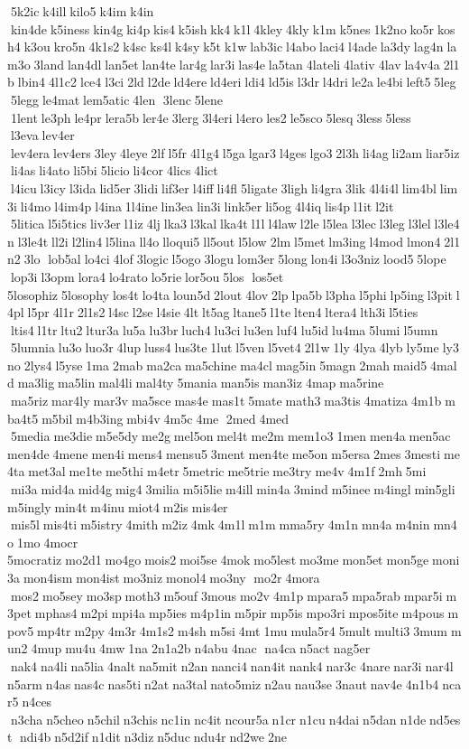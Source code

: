  5k2ic k4ill kilo5 k4im k4in  kin4de k5iness kin4g ki4p kis4 k5ish kk4 k1l 4kley 4kly k1m k5nes 1k2no ko5r kosh4 k3ou kro5n 4k1s2 k4sc ks4l k4sy k5t k1w lab3ic l4abo laci4 l4ade la3dy lag4n lam3o 3land lan4dl lan5et lan4te lar4g lar3i las4e la5tan 4lateli 4lativ 4lav la4v4a 2l1b lbin4 4l1c2 lce4 l3ci 2ld l2de ld4ere ld4eri ldi4 ld5is l3dr l4dri le2a le4bi left5 5leg  5legg le4mat lem5atic 4len  3lenc 5lene  1lent le3ph le4pr lera5b ler4e 3lerg 3l4eri l4ero les2 le5sco 5lesq 3less 5less  l3eva lev4er  lev4era lev4ers 3ley 4leye 2lf l5fr 4l1g4 l5ga lgar3 l4ges lgo3 2l3h li4ag li2am liar5iz li4as li4ato li5bi 5licio li4cor 4lics 4lict  l4icu l3icy l3ida lid5er 3lidi lif3er l4iff li4fl 5ligate 3ligh li4gra 3lik 4l4i4l lim4bl lim3i li4mo l4im4p l4ina 1l4ine lin3ea lin3i link5er li5og 4l4iq lis4p l1it l2it  5litica l5i5tics liv3er l1iz 4lj lka3 l3kal lka4t l1l l4law l2le l5lea l3lec l3leg l3lel l3le4n l3le4t ll2i l2lin4 l5lina ll4o lloqui5 ll5out l5low 2lm l5met lm3ing l4mod lmon4 2l1n2 3lo  lob5al lo4ci 4lof 3logic l5ogo 3logu lom3er 5long lon4i l3o3niz lood5 5lope  lop3i l3opm lora4 lo4rato lo5rie lor5ou 5los  los5et 	5losophiz 5losophy los4t lo4ta loun5d 2lout 4lov 2lp lpa5b l3pha l5phi lp5ing l3pit l4pl l5pr 4l1r 2l1s2 l4sc l2se l4sie 4lt lt5ag ltane5 l1te lten4 ltera4 lth3i l5ties  ltis4 l1tr ltu2 ltur3a lu5a lu3br luch4 lu3ci lu3en luf4 lu5id lu4ma 5lumi l5umn  5lumnia lu3o luo3r 4lup luss4 lus3te 1lut l5ven l5vet4 2l1w 1ly 4lya 4lyb ly5me ly3no 2lys4 l5yse 1ma 2mab ma2ca ma5chine ma4cl mag5in 5magn 2mah maid5 4mald ma3lig ma5lin mal4li mal4ty 5mania man5is man3iz 4map ma5rine  ma5riz mar4ly mar3v ma5sce mas4e mas1t 5mate math3 ma3tis 4matiza 4m1b mba4t5 m5bil m4b3ing mbi4v 4m5c 4me  2med 4med  5media me3die m5e5dy me2g mel5on mel4t me2m mem1o3 1men men4a men5ac men4de 4mene men4i mens4 mensu5 3ment men4te me5on m5ersa 2mes 3mesti me4ta met3al me1te me5thi m4etr 5metric me5trie me3try me4v 4m1f 2mh 5mi  mi3a mid4a mid4g mig4 3milia m5i5lie m4ill min4a 3mind m5inee m4ingl min5gli m5ingly min4t m4inu miot4 m2is mis4er  mis5l mis4ti m5istry 4mith m2iz 4mk 4m1l m1m mma5ry 4m1n mn4a m4nin mn4o 1mo 4mocr 	5mocratiz mo2d1 mo4go mois2 moi5se 4mok mo5lest mo3me mon5et mon5ge moni3a mon4ism mon4ist mo3niz monol4 mo3ny  mo2r 4mora  mos2 mo5sey mo3sp moth3 m5ouf 3mous mo2v 4m1p mpara5 mpa5rab mpar5i m3pet mphas4 m2pi mpi4a mp5ies m4p1in m5pir mp5is mpo3ri mpos5ite m4pous mpov5 mp4tr m2py 4m3r 4m1s2 m4sh m5si 4mt 1mu mula5r4 5mult multi3 3mum mun2 4mup mu4u 4mw 1na 2n1a2b n4abu 4nac  na4ca n5act nag5er  nak4 na4li na5lia 4nalt na5mit n2an nanci4 nan4it nank4 nar3c 4nare nar3i nar4l n5arm n4as nas4c nas5ti n2at na3tal nato5miz n2au nau3se 3naut nav4e 4n1b4 ncar5 n4ces  n3cha n5cheo n5chil n3chis nc1in nc4it ncour5a n1cr n1cu n4dai n5dan n1de nd5est  ndi4b n5d2if n1dit n3diz n5duc ndu4r nd2we 2ne 